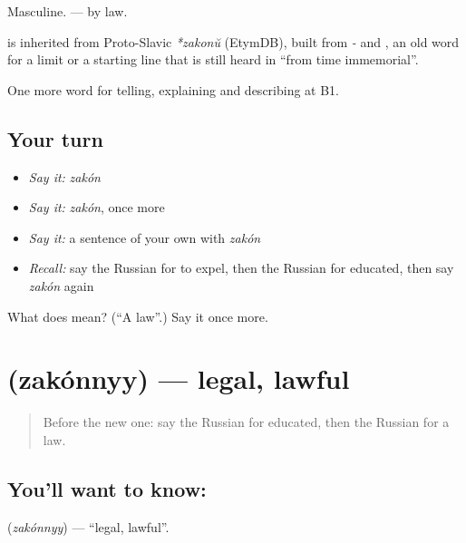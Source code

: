 Masculine. \emph{ } — by law.

\begin{cousinweb}
\textbf{} is inherited from Proto-Slavic \emph{*zakonŭ} (EtymDB), built from \emph{-} and \emph{}, an old word for a limit or a starting line that is still heard in \emph{ } \textquotedblleft{}from time immemorial\textquotedblright{}.
\end{cousinweb}

\begin{grammarlens}[title={What you've built}]
One more word for telling, explaining and describing at B1.
\end{grammarlens}

\subsection*{Your turn}
\begin{itemize}
\raggedright
  \item \emph{Say it:} \emph{zakón}
  \item \emph{Say it:} \emph{zakón}, once more
  \item \emph{Say it:} a sentence of your own with \emph{zakón}
  \item \emph{Recall:} say the Russian for to expel, then the Russian for educated, then say \emph{zakón} again
\end{itemize}

\begin{tcolorbox}[breakable,colback=teal!4,colframe=teal!35!black,title={Before you move on}]
What does  mean? (\textquotedblleft{}A law\textquotedblright{}.) Say it once more.
\end{tcolorbox}
\section[\texorpdfstring{\ru{законный} (zakónnyy)}{законный (zakónnyy)}]{ (zakónnyy) — legal, lawful}

\label{lesson:RU-C388-zakonnyy}



\begin{quote}
Before the new one: say the Russian for educated, then the Russian for a law.
\end{quote}

\subsection*{You'll want to know: }
\textbf{} (\emph{zakónnyy}) — \textquotedblleft{}legal, lawful\textquotedblright{}.

